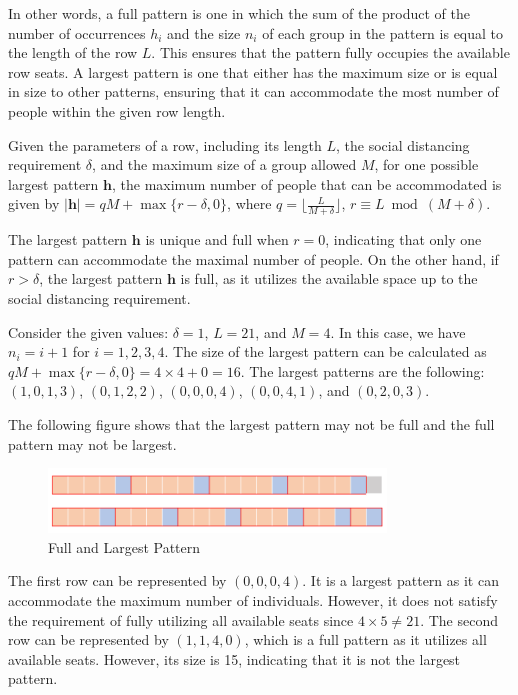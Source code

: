 In other words, a full pattern is one in which the sum of the product of the number of occurrences $h_i$ and the size $n_i$ of each group in the pattern is equal to the length of the row $L$. This ensures that the pattern fully occupies the available row seats. A largest pattern is one that either has the maximum size or is equal in size to other patterns, ensuring that it can accommodate the most number of people within the given row length.


\begin{prop}\label{lem_pattern}
Given the parameters of a row, including its length $L$, the social distancing requirement $\delta$, and the maximum size of a group allowed $M$, for one possible largest pattern $\bm{h}$, the maximum number of people that can be accommodated is given by $|\bm{h}| = qM + \max\{r-\delta, 0\}$, where $q = \lfloor \frac{L}{M + \delta} \rfloor$, $r \equiv L \bmod (M + \delta)$. 
\end{prop}


The largest pattern $\bm{h}$ is unique and full when $r = 0$, indicating that only one pattern can accommodate the maximal number of people. On the other hand, if $r > \delta$, the largest pattern $\bm{h}$ is full, as it utilizes the available space up to the social distancing requirement.


\begin{example}
Consider the given values: $\delta = 1$, $L = 21$, and $M = 4$. In this case, we have $n_i = i + 1$ for $i = 1, 2, 3, 4$. The size of the largest pattern can be calculated as $qM + \max\{r-\delta, 0\} = 4 \times 4 + 0 = 16$. The largest patterns are the following: $(1, 0, 1, 3)$, $(0, 1, 2, 2)$, $(0, 0, 0, 4)$, $(0, 0, 4, 1)$, and $(0, 2, 0, 3)$.

The following figure shows that the largest pattern may not be full and the full pattern may not be largest.
\begin{figure}[ht]
    \centering
        \includegraphics[width=0.8\textwidth]{./Figures/full_largest.png}
    \caption{Full and Largest Pattern}
\end{figure}

The first row can be represented by $(0, 0, 0, 4)$. It is a largest pattern as it can accommodate the maximum number of individuals. However, it does not satisfy the requirement of fully utilizing all available seats since $4 \times 5 \neq 21$.
The second row can be represented by $(1, 1, 4, 0)$, which is a full pattern as it utilizes all available seats. However, its size is 15, indicating that it is not the largest pattern.
\end{example}


